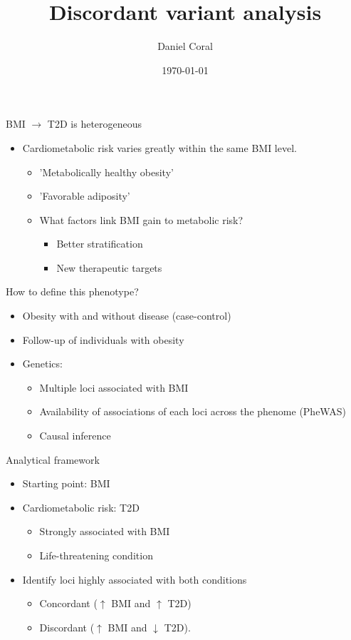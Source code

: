 \documentclass[presentation]{beamer}
\author{Daniel Coral}
\date{\today}
\title{Discordant variant analysis}
\institute{GAME unit - LUDC}
\begin{document}
\maketitle

\begin{frame}[label={sec:org76f6936}]{BMI \(\rightarrow\) T2D is heterogeneous}
\begin{itemize}
\item Cardiometabolic risk varies greatly within the same BMI level.
\begin{itemize}
\item 'Metabolically healthy obesity'
\item 'Favorable adiposity'
\item What factors link BMI gain to metabolic risk?
\begin{itemize}
\item Better stratification
\item New therapeutic targets
\end{itemize}
\end{itemize}
\end{itemize}
\end{frame}

\begin{frame}[label={sec:orgdcdc198}]{How to define this phenotype?}
\begin{itemize}
\item Obesity with and without disease (case-control)
\item Follow-up of individuals with obesity
\item Genetics:
\begin{itemize}
\item Multiple loci associated with BMI
\item Availability of associations of each loci across the phenome (PheWAS)
\item Causal inference
\end{itemize}
\end{itemize}
\end{frame}

\begin{frame}[label={sec:org64f577f}]{Analytical framework}
\begin{itemize}
\item Starting point: BMI
\item Cardiometabolic risk: T2D
\begin{itemize}
\item Strongly associated with BMI
\item Life-threatening condition
\end{itemize}
\item Identify loci highly associated with both conditions
\begin{itemize}
\item Concordant (\(\uparrow\) BMI and \(\uparrow\) T2D)
\item Discordant (\(\uparrow\) BMI and \(\downarrow\) T2D).
\end{itemize}
\end{itemize}
\end{frame}
\end{document}
